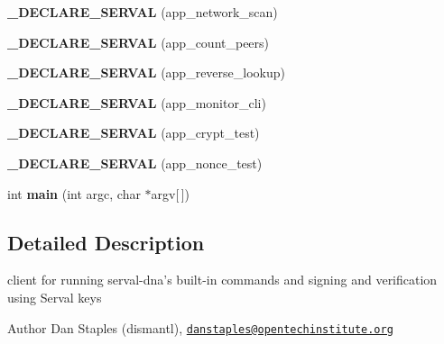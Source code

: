 \begin{DoxyCompactItemize}
\item 
\hypertarget{serval-client_8c_a12c015a85b7b77786dafdf20c5c6bf11}{{\bfseries \+\_\+\+D\+E\+C\+L\+A\+R\+E\+\_\+\+S\+E\+R\+V\+A\+L} (app\+\_\+network\+\_\+scan)}\label{serval-client_8c_a12c015a85b7b77786dafdf20c5c6bf11}

\item 
\hypertarget{serval-client_8c_abc47d452c0882407b185351c83e68825}{{\bfseries \+\_\+\+D\+E\+C\+L\+A\+R\+E\+\_\+\+S\+E\+R\+V\+A\+L} (app\+\_\+count\+\_\+peers)}\label{serval-client_8c_abc47d452c0882407b185351c83e68825}

\item 
\hypertarget{serval-client_8c_ac93e781fff164a77805e37d23c67fa64}{{\bfseries \+\_\+\+D\+E\+C\+L\+A\+R\+E\+\_\+\+S\+E\+R\+V\+A\+L} (app\+\_\+reverse\+\_\+lookup)}\label{serval-client_8c_ac93e781fff164a77805e37d23c67fa64}

\item 
\hypertarget{serval-client_8c_a2b600eb8bf56c6d740d6d5ab99042cb6}{{\bfseries \+\_\+\+D\+E\+C\+L\+A\+R\+E\+\_\+\+S\+E\+R\+V\+A\+L} (app\+\_\+monitor\+\_\+cli)}\label{serval-client_8c_a2b600eb8bf56c6d740d6d5ab99042cb6}

\item 
\hypertarget{serval-client_8c_a492ea3e4a6f48f0cc03dc27c8bde749d}{{\bfseries \+\_\+\+D\+E\+C\+L\+A\+R\+E\+\_\+\+S\+E\+R\+V\+A\+L} (app\+\_\+crypt\+\_\+test)}\label{serval-client_8c_a492ea3e4a6f48f0cc03dc27c8bde749d}

\item 
\hypertarget{serval-client_8c_ac7f92bf249a070e2799acf2c094f8fef}{{\bfseries \+\_\+\+D\+E\+C\+L\+A\+R\+E\+\_\+\+S\+E\+R\+V\+A\+L} (app\+\_\+nonce\+\_\+test)}\label{serval-client_8c_ac7f92bf249a070e2799acf2c094f8fef}

\item 
\hypertarget{serval-client_8c_a0ddf1224851353fc92bfbff6f499fa97}{int {\bfseries main} (int argc, char $\ast$argv\mbox{[}$\,$\mbox{]})}\label{serval-client_8c_a0ddf1224851353fc92bfbff6f499fa97}

\end{DoxyCompactItemize}


\subsection{Detailed Description}
client for running serval-\/dna's built-\/in commands and signing and verification using Serval keys 

\begin{DoxyAuthor}{Author}
Dan Staples (dismantl), \href{mailto:danstaples@opentechinstitute.org}{\tt danstaples@opentechinstitute.\+org} 
\end{DoxyAuthor}
